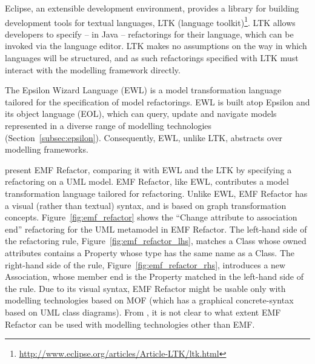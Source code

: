 Eclipse, an extensible development environment, provides a library for building development tools for textual languages, LTK (language toolkit)\footnote{\url{http://www.eclipse.org/articles/Article-LTK/ltk.html}}. LTK allows developers to specify -- in Java -- refactorings for their language, which can be invoked via the language editor. LTK makes no assumptions on the way in which languages will be structured, and as such refactorings specified with LTK must interact with the modelling framework directly.

The Epsilon Wizard Language (EWL) \cite{kolovos07ewl} is a model transformation language tailored for the specification of model refactorings. EWL is built atop Epsilon and its object language (EOL), which can query, update and navigate models represented in a diverse range of modelling technologies (Section~\ref{subsec:epsilon}). Consequently, EWL, unlike LTK, abstracts over modelling frameworks.

\cite{arendt09refactoring} present EMF Refactor, comparing it with EWL and the LTK by specifying a refactoring on a UML model. EMF Refactor, like EWL, contributes a model transformation language tailored for refactoring. Unlike EWL, EMF Refactor has a visual (rather than textual) syntax, and is based on graph transformation concepts. Figure~\ref{fig:emf_refactor} shows the ``Change attribute to association end'' refactoring for the UML metamodel in EMF Refactor. The left-hand side of the refactoring rule, Figure~\ref{fig:emf_refactor_lhs}, matches a Class whose owned attributes contains a Property whose type has the same name as a Class. The right-hand side of the rule, Figure~\ref{fig:emf_refactor_rhs}, introduces a new Association, whose member end is the Property matched in the left-hand side of the rule. Due to its visual syntax, EMF Refactor might be usable only with modelling technologies based on MOF (which has a graphical concrete-syntax based on UML class diagrams).  From \cite{arendt09refactoring}, it is not clear to what extent EMF Refactor can be used with modelling technologies other than EMF.

